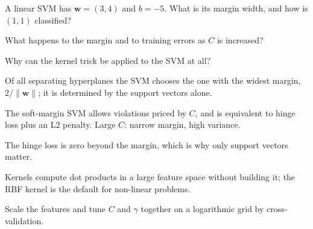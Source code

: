 \begin{checkpoint}
\begin{tightnum}
  \item A linear SVM has $\mathbf{w} = (3, 4)$ and $b = -5$. What is its margin width,
        and how is $(1, 1)$ classified?
  \item What happens to the margin and to training errors as $C$ is increased?
  \item Why can the kernel trick be applied to the SVM at all?
\end{tightnum}
\end{checkpoint}

\begin{chaptersummary}
\begin{tight}
  \item Of all separating hyperplanes the SVM chooses the one with the widest
        margin, $2/\|\mathbf{w}\|$; it is determined by the support vectors alone.
  \item The soft-margin SVM allows violations priced by $C$, and is equivalent to
        hinge loss plus an L2 penalty. Large $C$: narrow margin, high variance.
  \item The hinge loss is zero beyond the margin, which is why only support vectors
        matter.
  \item Kernels compute dot products in a large feature space without building it;
        the RBF kernel is the default for non-linear problems.
  \item Scale the features and tune $C$ and $\gamma$ together on a logarithmic grid
        by cross-validation.
\end{tight}
\end{chaptersummary}

